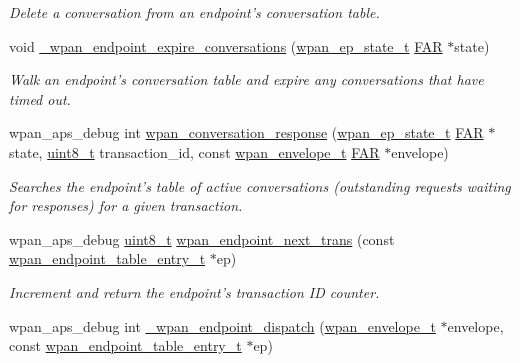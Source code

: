 \begin{DoxyCompactItemize}
\begin{DoxyCompactList}\small\item\em Delete a conversation from an endpoint's conversation table. \end{DoxyCompactList}\item 
void \hyperlink{group__wpan__aps_gad55133545fcf6ebc2d630057abf5ad48}{\-\_\-wpan\-\_\-endpoint\-\_\-expire\-\_\-conversations} (\hyperlink{structwpan__ep__state__t}{wpan\-\_\-ep\-\_\-state\-\_\-t} \hyperlink{group__hal_gaef060b3456fdcc093a7210a762d5f2ed}{F\-A\-R} $\ast$state)
\begin{DoxyCompactList}\small\item\em Walk an endpoint's conversation table and expire any conversations that have timed out. \end{DoxyCompactList}\item 
wpan\-\_\-aps\-\_\-debug int \hyperlink{group__wpan__aps_gaf56e4d0e52462b5cf41c5fa5f23ea952}{wpan\-\_\-conversation\-\_\-response} (\hyperlink{structwpan__ep__state__t}{wpan\-\_\-ep\-\_\-state\-\_\-t} \hyperlink{group__hal_gaef060b3456fdcc093a7210a762d5f2ed}{F\-A\-R} $\ast$state, \hyperlink{group__hal_gae1affc9ca37cfb624959c866a73f83c2}{uint8\-\_\-t} transaction\-\_\-id, const \hyperlink{structwpan__envelope__t}{wpan\-\_\-envelope\-\_\-t} \hyperlink{group__hal_gaef060b3456fdcc093a7210a762d5f2ed}{F\-A\-R} $\ast$envelope)
\begin{DoxyCompactList}\small\item\em Searches the endpoint's table of active conversations (outstanding requests waiting for responses) for a given transaction. \end{DoxyCompactList}\item 
wpan\-\_\-aps\-\_\-debug \hyperlink{group__hal_gae1affc9ca37cfb624959c866a73f83c2}{uint8\-\_\-t} \hyperlink{group__wpan__aps_gaab1c77ccbd237270f11499fb6411599c}{wpan\-\_\-endpoint\-\_\-next\-\_\-trans} (const \hyperlink{structwpan__endpoint__table__entry__t}{wpan\-\_\-endpoint\-\_\-table\-\_\-entry\-\_\-t} $\ast$ep)
\begin{DoxyCompactList}\small\item\em Increment and return the endpoint's transaction I\-D counter. \end{DoxyCompactList}\item 
wpan\-\_\-aps\-\_\-debug int \hyperlink{group__wpan__aps_gaea487a9cccf8d5a2c592324678f13b4b}{\-\_\-wpan\-\_\-endpoint\-\_\-dispatch} (\hyperlink{structwpan__envelope__t}{wpan\-\_\-envelope\-\_\-t} $\ast$envelope, const \hyperlink{structwpan__endpoint__table__entry__t}{wpan\-\_\-endpoint\-\_\-table\-\_\-entry\-\_\-t} $\ast$ep)

\end{DoxyCompactItemize}
